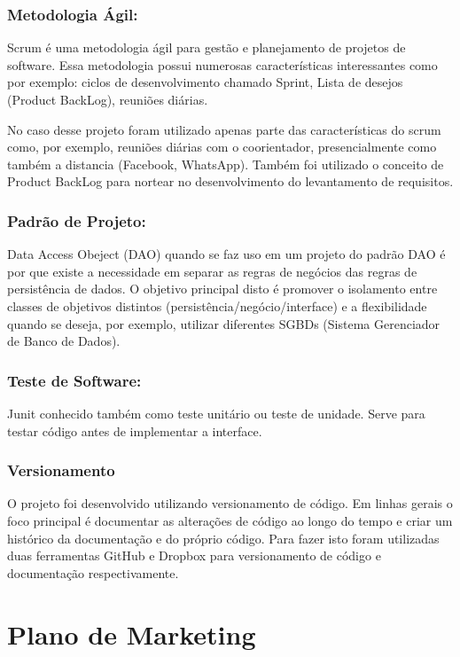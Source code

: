 \documentclass[chapter=TITLE,12pt,oneside,a4paper,english,french,sumario=tradicional,spanish,brazil,]{abntex2}
\begin{document}
\subsection{Metodologia Ágil:}
Scrum é uma metodologia ágil para gestão e planejamento de projetos de software. Essa metodologia possui numerosas características interessantes como por exemplo: ciclos de desenvolvimento chamado Sprint, Lista de desejos (Product BackLog), reuniões diárias.

No caso desse projeto foram utilizado apenas parte das características do scrum como, por exemplo, reuniões diárias com o coorientador, presencialmente como também a distancia (Facebook, WhatsApp). Também foi utilizado o conceito de Product BackLog para nortear no desenvolvimento do levantamento de requisitos.


\subsection{Padrão de Projeto:}
Data Access Obeject (DAO) quando se faz uso em um projeto do padrão DAO é por que existe a necessidade em separar as regras de negócios das regras de persistência de dados. O objetivo principal disto é promover o isolamento entre classes de objetivos distintos (persistência/negócio/interface) e a flexibilidade quando se deseja, por exemplo, utilizar diferentes SGBDs (Sistema Gerenciador de Banco de Dados).

\subsection{Teste de Software:}
Junit conhecido também como teste unitário ou teste de unidade. Serve para testar código antes de implementar a interface.

\subsection{Versionamento}
O projeto foi desenvolvido utilizando versionamento de código. Em linhas gerais o foco principal é documentar as alterações de código ao longo do tempo e criar um histórico da documentação e do próprio código. Para fazer isto foram utilizadas duas ferramentas GitHub e Dropbox para versionamento de código e documentação respectivamente.


\chapter{Plano de Marketing}
\end{document}
